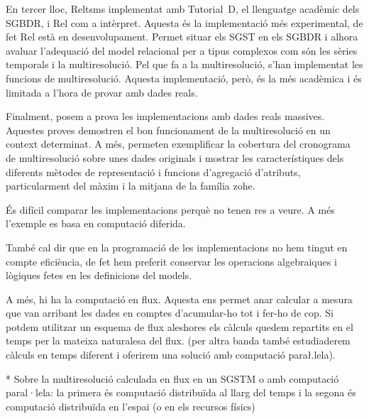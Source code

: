 En tercer lloc, Reltsms implementat amb Tutorial~D, el llenguatge
acadèmic dels \gls{SGBDR}, i Rel com a intèrpret.  Aquesta és la
implementació més experimental, de fet Rel està en desenvolupament.
Permet situar els \gls{SGST} en els \gls{SGBDR} i alhora avaluar
l'adequació del model relacional per a tipus complexos com són les
sèries temporals i la multiresolució.  Pel que fa a la multiresolució,
s'han implementat les funcions de multiresolució. Aquesta
implementació, però, és la més acadèmica i és limitada a l'hora de
provar amb dades reals.



Finalment, posem a prova les implementacions amb dades reals massives.
Aquestes proves demostren el bon funcionament de la multiresolució en
un context determinat. A més, permeten exemplificar la cobertura del
cronograma de multiresolució sobre unes dades originals i mostrar les
característiques dels diferents mètodes de representació i funcions
d'agregació d'atributs, particularment del màxim i la mitjana de la
família \gls{zohe}.






És difícil comparar les implementacions perquè no tenen res a veure. A més l'exemple es basa en computació diferida. 

També cal dir que en la programació de les implementacions no hem tingut en compte eficiència, de fet hem preferit conservar les operacions algebraiques i lògiques fetes en les definicions del models.

A més, hi ha la computació en flux. Aquesta ens permet anar calcular a mesura que van arribant les dades en comptes d'acumular-ho tot i fer-ho de cop. Si potdem utilitzar un esquema de flux aleshores els càlculs quedem repartits en el temps per la mateixa naturalesa del flux. (per altra banda també estudiaderem càlculs en temps diferent i oferirem una solució amb computació para\l.lela).

* Sobre la multiresolució calculada en flux en un SGSTM o amb computació paral·lela: la primera és computació distribuïda al llarg del temps i la segona és computació distribuïda en l'espai (o en els recursos físics)


